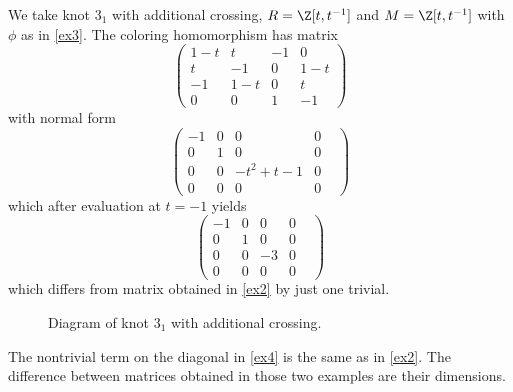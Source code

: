 \begin{example}\label{ex4}
  We take knot $3_1$ with additional crossing, $R=\Z[t, t^{-1}]$ and $M=\Z[t, t^{-1}]$ with $\phi$ as in \cref{ex3}. The coloring homomorphism has matrix
  $$
  \begin{pmatrix}
    1-t & t & -1 & 0 \\ 
    t & -1 & 0 & 1-t \\ 
    -1 & 1-t & 0 & t \\ 
    0 & 0 & 1 & -1 
  \end{pmatrix}
  $$
  with normal form
  $$
  \begin{pmatrix}
    -1 & 0 & 0 & 0\\ 
    0 & 1 & 0 & 0 \\ 
    0 & 0 & -t^2+t-1 & 0 \\ 
    0 & 0 & 0 & 0 &
  \end{pmatrix}
  $$
  which after evaluation at $t=-1$ yields
  $$
  \begin{pmatrix}
    -1 & 0 & 0 & 0\\ 
    0 & 1 & 0 & 0 \\ 
    0 & 0 & -3 & 0 \\ 
    0 & 0 & 0 & 0 &
  \end{pmatrix}
  $$
  which differs from matrix obtained in \cref{ex2} by just one trivial.
  \begin{figure}[h]\centering 
    \caption{Diagram of knot $3_1$ with additional crossing.\label{trefoil z dodatkowym skrzyzowaniem}}
  \end{figure}
\end{example}

The nontrivial term on the diagonal in \cref{ex4} is the same as in \cref{ex2}. The difference between matrices obtained in those two examples are their dimensions.

